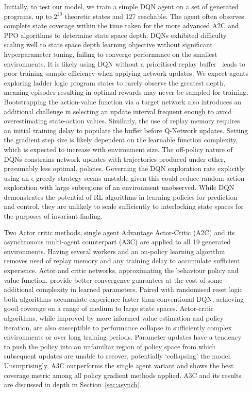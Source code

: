 \documentclass[runningheads]{llncs}
\begin{document}
Initially, to test our model, we train a simple DQN agent on a set of generated programs, up to $2^{20}$ theoretic states and 127 reachable. The agent often observes complete state coverage within the time taken for the more advanced A2C and PPO algorithms to determine state space depth. DQNs exhibited difficulty scaling well to state space depth learning objective without significant hyperparameter tuning, failing to converge performance on the smallest environments. It is likely using DQN without a prioritised replay buffer~\cite{andrychowicz2017hindsight} leads to poor training sample efficiency when applying network updates. We expect agents exploring ladder logic program states to rarely observe the greatest depth, meaning episodes resulting in optimal rewards may never be sampled for training. Bootstrapping the action-value function via a target network also introduces an additional challenge in selecting an update interval frequent enough to avoid overestimating state-action values. Similarly, the use of replay memory requires an initial training delay to populate the buffer before Q-Network updates. Setting the gradient step size is likely dependent on the  learnable function complexity, which is expected to increase with environment size. The off-policy nature of DQNs constrains network updates with trajectories produced under other, presumably less optimal, policies. Governing the DQN exploration rate explicitly using an $\epsilon$-greedy strategy seems unstable given this could reduce random action exploration with large subregions of an environment unobserved. While DQN demonstrates the potential of RL algorithms in learning policies for prediction and control, they are unlikely to scale sufficiently to interlocking state spaces for the purposes of invariant finding.

Two Actor critic methods, single agent Advantage Actor-Critic (A2C) and its asynchronous multi-agent counterpart (A3C) are applied to all 19 generated environments. Having several workers and an on-policy learning algorithm removes need of replay memory and any training delay to accumulate sufficient experience. Actor and critic networks, approximating the behaviour policy and value function, provide better convergence guarantees at the cost of some additional complexity in learned parameters. Paired with randomised reset logic both algorithms accumulate experience faster than conventional DQN, achieving good coverage on a range of medium to large state spaces.  Actor-critic algorithms, while improved by more informed value estimation and policy iteration, are also susceptible to performance collapse in sufficiently complex environments or over long training periods. Parameter updates have a tendency to push the policy  into an unfamiliar region of policy space from which subsequent updates are unable to recover, potentially `collapsing' the model. Unsurprisingly, A3C outperforms the single agent variant and shows the best coverage metric among all policy gradient methods applied. A3C and its results are discussed in depth in Section~\ref{sec:asynch}.
\end{document}
